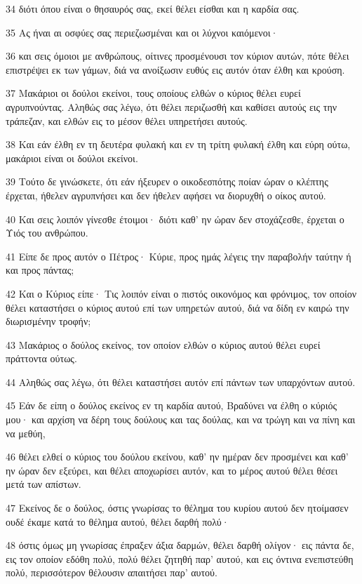 \par 34 διότι όπου είναι ο θησαυρός σας, εκεί θέλει είσθαι και η καρδία σας.
\par 35 Ας ήναι αι οσφύες σας περιεζωσμέναι και οι λύχνοι καιόμενοι·
\par 36 και σεις όμοιοι με ανθρώπους, οίτινες προσμένουσι τον κύριον αυτών, πότε θέλει επιστρέψει εκ των γάμων, διά να ανοίξωσιν ευθύς εις αυτόν όταν έλθη και κρούση.
\par 37 Μακάριοι οι δούλοι εκείνοι, τους οποίους ελθών ο κύριος θέλει ευρεί αγρυπνούντας. Αληθώς σας λέγω, ότι θέλει περιζωσθή και καθίσει αυτούς εις την τράπεζαν, και ελθών εις το μέσον θέλει υπηρετήσει αυτούς.
\par 38 Και εάν έλθη εν τη δευτέρα φυλακή και εν τη τρίτη φυλακή έλθη και εύρη ούτω, μακάριοι είναι οι δούλοι εκείνοι.
\par 39 Τούτο δε γινώσκετε, ότι εάν ήξευρεν ο οικοδεσπότης ποίαν ώραν ο κλέπτης έρχεται, ήθελεν αγρυπνήσει και δεν ήθελεν αφήσει να διορυχθή ο οίκος αυτού.
\par 40 Και σεις λοιπόν γίνεσθε έτοιμοι· διότι καθ' ην ώραν δεν στοχάζεσθε, έρχεται ο Υιός του ανθρώπου.
\par 41 Είπε δε προς αυτόν ο Πέτρος· Κύριε, προς ημάς λέγεις την παραβολήν ταύτην ή και προς πάντας;
\par 42 Και ο Κύριος είπε· Τις λοιπόν είναι ο πιστός οικονόμος και φρόνιμος, τον οποίον θέλει καταστήσει ο κύριος αυτού επί των υπηρετών αυτού, διά να δίδη εν καιρώ την διωρισμένην τροφήν;
\par 43 Μακάριος ο δούλος εκείνος, τον οποίον ελθών ο κύριος αυτού θέλει ευρεί πράττοντα ούτως.
\par 44 Αληθώς σας λέγω, ότι θέλει καταστήσει αυτόν επί πάντων των υπαρχόντων αυτού.
\par 45 Εάν δε είπη ο δούλος εκείνος εν τη καρδία αυτού, Βραδύνει να έλθη ο κύριός μου· και αρχίση να δέρη τους δούλους και τας δούλας, και να τρώγη και να πίνη και να μεθύη,
\par 46 θέλει ελθεί ο κύριος του δούλου εκείνου, καθ' ην ημέραν δεν προσμένει και καθ' ην ώραν δεν εξεύρει, και θέλει αποχωρίσει αυτόν, και το μέρος αυτού θέλει θέσει μετά των απίστων.
\par 47 Εκείνος δε ο δούλος, όστις γνωρίσας το θέλημα του κυρίου αυτού δεν ητοίμασεν ουδέ έκαμε κατά το θέλημα αυτού, θέλει δαρθή πολύ·
\par 48 όστις όμως μη γνωρίσας έπραξεν άξια δαρμών, θέλει δαρθή ολίγον· εις πάντα δε, εις τον οποίον εδόθη πολύ, πολύ θέλει ζητηθή παρ' αυτού, και εις όντινα ενεπιστεύθη πολύ, περισσότερον θέλουσιν απαιτήσει παρ' αυτού.
